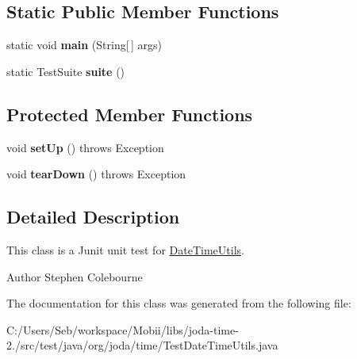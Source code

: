 \subsection*{Static Public Member Functions}
\begin{DoxyCompactItemize}
\item 
\hypertarget{classorg_1_1joda_1_1time_1_1_test_date_time_utils_ad5f52a958dec8b2bf8c897b88fc0f0ec}{static void {\bfseries main} (String\mbox{[}$\,$\mbox{]} args)}\label{classorg_1_1joda_1_1time_1_1_test_date_time_utils_ad5f52a958dec8b2bf8c897b88fc0f0ec}

\item 
\hypertarget{classorg_1_1joda_1_1time_1_1_test_date_time_utils_ae698a1f47c444ba5b4bb98939c18ac55}{static Test\-Suite {\bfseries suite} ()}\label{classorg_1_1joda_1_1time_1_1_test_date_time_utils_ae698a1f47c444ba5b4bb98939c18ac55}

\end{DoxyCompactItemize}
\subsection*{Protected Member Functions}
\begin{DoxyCompactItemize}
\item 
\hypertarget{classorg_1_1joda_1_1time_1_1_test_date_time_utils_a5a88ede43f75edc9787f823ea9264dc7}{void {\bfseries set\-Up} ()  throws Exception }\label{classorg_1_1joda_1_1time_1_1_test_date_time_utils_a5a88ede43f75edc9787f823ea9264dc7}

\item 
\hypertarget{classorg_1_1joda_1_1time_1_1_test_date_time_utils_a5a74e07b2673abee113385bd380b419d}{void {\bfseries tear\-Down} ()  throws Exception }\label{classorg_1_1joda_1_1time_1_1_test_date_time_utils_a5a74e07b2673abee113385bd380b419d}

\end{DoxyCompactItemize}


\subsection{Detailed Description}
This class is a Junit unit test for \hyperlink{classorg_1_1joda_1_1time_1_1_date_time_utils}{Date\-Time\-Utils}.

\begin{DoxyAuthor}{Author}
Stephen Colebourne 
\end{DoxyAuthor}


The documentation for this class was generated from the following file\-:\begin{DoxyCompactItemize}
\item 
C\-:/\-Users/\-Seb/workspace/\-Mobii/libs/joda-\/time-\/2./src/test/java/org/joda/time/Test\-Date\-Time\-Utils.\-java\end{DoxyCompactItemize}
